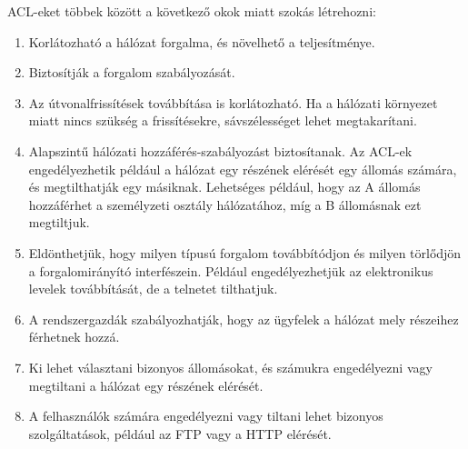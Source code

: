 ACL-eket többek között a következő okok miatt szokás létrehozni:
\begin{enumerate}[nosep]
	\item Korlátozható a hálózat forgalma, és növelhető a teljesítménye.
	\item Biztosítják a forgalom szabályozását.
	\item Az útvonalfrissítések továbbítása is korlátozható. Ha a hálózati környezet miatt nincs szükség a frissítésekre, sávszélességet lehet megtakarítani.
	\item Alapszintű hálózati hozzáférés-szabályozást biztosítanak. Az ACL-ek engedélyezhetik például a hálózat egy részének elérését egy állomás számára, és megtilthatják egy másiknak. Lehetséges például, hogy az A állomás hozzáférhet a személyzeti osztály hálózatához, míg a B állomásnak ezt megtiltjuk.
	\item Eldönthetjük, hogy milyen típusú forgalom továbbítódjon és milyen törlődjön a forgalomirányító interfészein. Például engedélyezhetjük az elektronikus levelek továbbítását, de a telnetet tilthatjuk.
	\item A rendszergazdák szabályozhatják, hogy az ügyfelek a hálózat mely részeihez férhetnek hozzá.
	\item Ki lehet választani bizonyos állomásokat, és számukra engedélyezni vagy megtiltani a hálózat egy részének elérését.
	\item A felhasználók számára engedélyezni vagy tiltani lehet bizonyos szolgáltatások, például az FTP vagy a HTTP elérését.
\end{enumerate}

